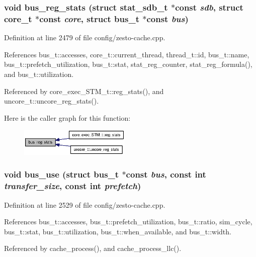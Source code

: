 \subsubsection[{bus\_\-reg\_\-stats}]{\setlength{\rightskip}{0pt plus 5cm}void bus\_\-reg\_\-stats (struct {\bf stat\_\-sdb\_\-t} $\ast$const  {\em sdb}, \/  struct {\bf core\_\-t} $\ast$const  {\em core}, \/  struct {\bf bus\_\-t} $\ast$const  {\em bus})}\label{zesto-cache_8h_22d7e9c4a1a2031601e5a3ad3694768c}




Definition at line 2479 of file config/zesto-cache.cpp.

References bus\_\-t::accesses, core\_\-t::current\_\-thread, thread\_\-t::id, bus\_\-t::name, bus\_\-t::prefetch\_\-utilization, bus\_\-t::stat, stat\_\-reg\_\-counter, stat\_\-reg\_\-formula(), and bus\_\-t::utilization.

Referenced by core\_\-exec\_\-STM\_\-t::reg\_\-stats(), and uncore\_\-t::uncore\_\-reg\_\-stats().

Here is the caller graph for this function:\nopagebreak
\begin{figure}[H]
\begin{center}
\leavevmode
\includegraphics[width=150pt]{zesto-cache_8h_22d7e9c4a1a2031601e5a3ad3694768c_icgraph}
\end{center}
\end{figure}
\subsubsection[{bus\_\-use}]{\setlength{\rightskip}{0pt plus 5cm}void bus\_\-use (struct {\bf bus\_\-t} $\ast$const  {\em bus}, \/  const int {\em transfer\_\-size}, \/  const int {\em prefetch})}\label{zesto-cache_8h_cb6440bff7b9405665cbae0d836630f3}




Definition at line 2529 of file config/zesto-cache.cpp.

References bus\_\-t::accesses, bus\_\-t::prefetch\_\-utilization, bus\_\-t::ratio, sim\_\-cycle, bus\_\-t::stat, bus\_\-t::utilization, bus\_\-t::when\_\-available, and bus\_\-t::width.

Referenced by cache\_\-process(), and cache\_\-process\_\-llc().

